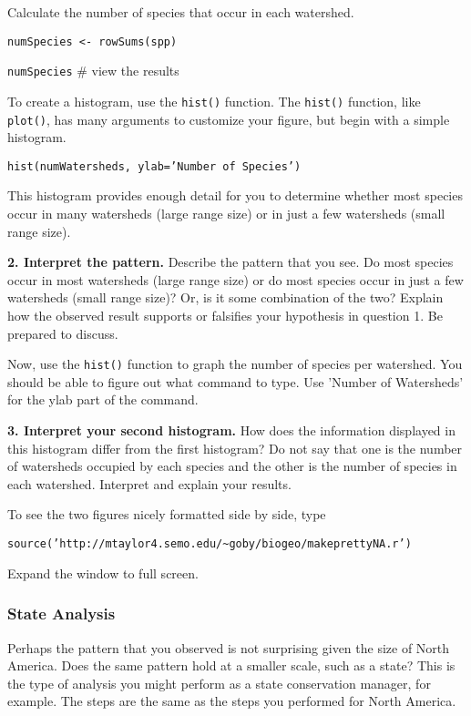 \documentclass[11pt]{article}
\begin{document}
Calculate the number of species that occur in each watershed.

\texttt{numSpecies \textless{}- rowSums(spp)}

\texttt{numSpecies} \qquad \# view the results

To create a histogram, use the \texttt{hist()} function. The
\texttt{hist()} function, like \texttt{plot()}, has many arguments to
customize your figure, but begin with a simple histogram.

\texttt{hist(numWatersheds, ylab='Number of Species')}

This histogram provides enough detail for you to determine whether most
species occur in many watersheds (large range size) or in just a few
watersheds (small range size).

\textbf{2. Interpret the pattern.} Describe the pattern that you see. Do most
species occur in most watersheds (large range size) or do most species
occur in just a few watersheds (small range size)? Or, is it some
combination of the two? Explain how the observed result supports or
falsifies your hypothesis in question 1. Be prepared to discuss.

\vspace{6\baselineskip}

Now, use the \texttt{hist()} function to graph the number of species per
watershed. You should be able to figure out what command to type. Use 'Number 
of Watersheds' for the ylab part of the command.

\textbf{3. Interpret your second histogram.} How does the information displayed
in this histogram differ from the first histogram? Do not say that
one is the number of watersheds occupied by each species and the other
is the number of species in each watershed. Interpret and explain your results.

\vspace{6\baselineskip}

To see the two figures nicely formatted side by side, type

\texttt{source('http://mtaylor4.semo.edu/\textasciitilde{}goby/biogeo/makeprettyNA.r')}

Expand the window to full screen. 

\subsubsection*{State Analysis}

Perhaps the pattern that you observed is not surprising given the size
of North America. Does the same pattern hold at a smaller scale, such as a state?
This is the type of analysis you might perform as a state conservation
manager, for example. The steps are the same as the steps you
performed for North America.
\end{document}
